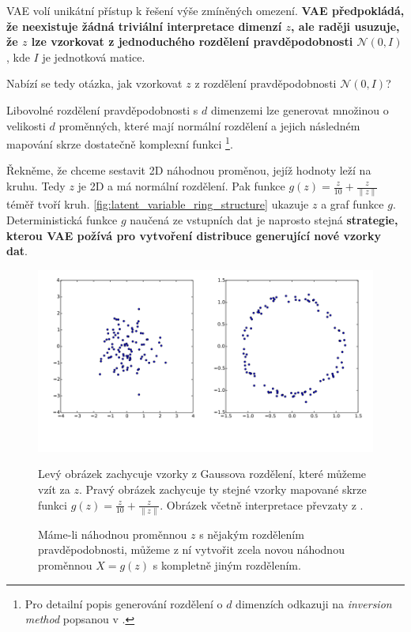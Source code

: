 VAE volí unikátní přístup k řešení výše zmíněných omezení. \textbf{VAE předpokládá, že neexistuje žádná triviální interpretace dimenzí $z$, ale raději usuzuje, že $z$ lze vzorkovat z jednoduchého rozdělení pravděpodobnosti $\mathcal{N}(0, I)$}, kde $I$ je jednotková matice. \cite{Doersch2021}

Nabízí se tedy otázka, jak vzorkovat $z$ z rozdělení pravděpodobnosti $\mathcal{N}(0, I)$?

Libovolné rozdělení pravděpodobnosti s $d$ dimenzemi lze generovat množinou o velikosti $d$ proměnných, které mají normální rozdělení a jejich následném mapování skrze dostatečně komplexní funkci
\footnote{Pro detailní popis generování rozdělení o $d$ dimenzích odkazuji na \emph{inversion method} popsanou v \cite{Devroye1986}.}.

Řekněme, že chceme sestavit 2D náhodnou proměnou, jejíž hodnoty leží na kruhu.
Tedy $z$ je 2D a má normální rozdělení. Pak funkce $g(z) = \frac{z}{10} + \frac{z}{\| z \|}$ téměř tvoří kruh.
\autoref{fig:latent_variable_ring_structure} ukazuje $z$ a graf funkce $g$.
Deterministická funkce $g$ naučená ze vstupních dat je naprosto stejná \textbf{strategie, kterou VAE požívá pro vytvoření distribuce generující nové vzorky dat}.  \cite{Doersch2021}

\begin{figure}[H]
    \includegraphics[width=\textwidth]{img/latent_variable_ring_structure.png}
    \caption{Máme-li náhodnou proměnnou $z$ s nějakým rozdělením pravděpodobnosti, můžeme z ní vytvořit zcela novou náhodnou proměnnou $X = g(z)$ s kompletně jiným rozdělením.}
    Levý obrázek zachycuje vzorky z Gaussova rozdělení, které můžeme vzít za $z$. Pravý obrázek zachycuje ty stejné vzorky mapované skrze funkci $g(z) = \frac{z}{10} + \frac{z}{\| z \|}$.
    Obrázek včetně interpretace převzaty z \cite{Doersch2021}.
    \label{fig:latent_variable_ring_structure}
\end{figure}

